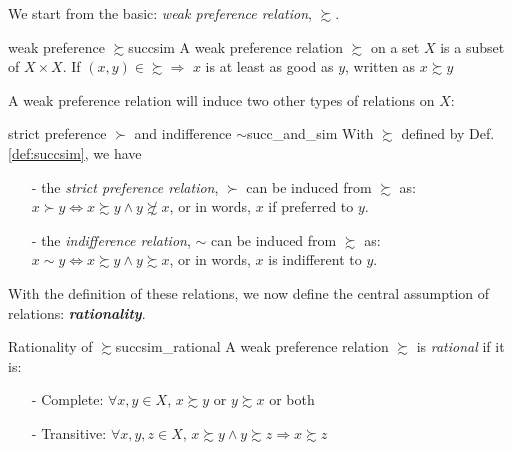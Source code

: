 We start from the basic: \textit{weak preference relation}, $\succsim$.
\begin{definition}{weak preference $\succsim$}{succsim}
    A weak preference relation $\succsim$ on a set $X$ is a subset of $X\times X$. If $(x,y)\in \succsim \Rightarrow$ $x$ is at least as good as $y$, written as $x\succsim y$
\end{definition}

A weak preference relation will induce two other types of relations on $X$:
\begin{definition}{strict preference $\succ$ and indifference $\sim$}{succ_and_sim}
    With $\succsim$ defined by Def. \ref{def:succsim}, we have
    \begin{enumerate}
        \item[-] the \textit{strict preference relation}, $\succ$ can be induced from $\succsim$ as: $x\succ y\Leftrightarrow x\succsim y \land y\not\succsim x$,
        or in words, $x$ if preferred to $y$.
        \item[-] the \textit{indifference relation}, $\sim$ can be induced from $\succsim$ as: $x\sim y \Leftrightarrow x\succsim y \land y\succsim x$, or in words, $x$ is indifferent to $y$.
    \end{enumerate}
\end{definition}

With the definition of these relations, we now define the central assumption of relations: \textit{\textbf{rationality}}. 
\begin{definition}{Rationality of $\succsim$}{succsim_rational}
    A weak preference relation $\succsim$ is \textit{rational} if it is:
    \begin{enumerate}
        \item[-] Complete: $\forall x,y\in X$, $x\succsim y$ or $y\succsim x$ or both 
        \item[-] Transitive: $\forall x,y,z\in X$, $x\succsim y\land y\succsim z\Rightarrow x\succsim z$
    \end{enumerate}
\end{definition}

